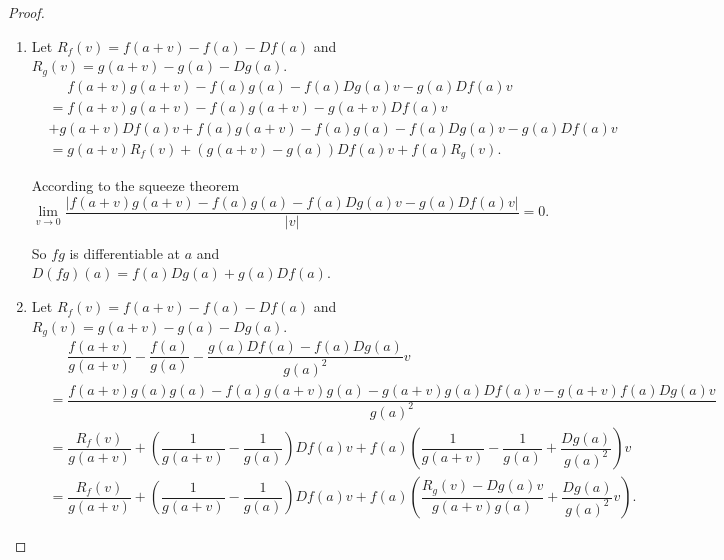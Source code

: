 \begin{proof}
\begin{enumerate}[itemsep=0pt,label={(\alph*)}]
              so \( \lim\limits_{v \to 0} \dfrac{\left\vert (F + G)(a + v) - (F + G)(a) - DF(a)v - DG(a)v \right\vert}{\left\vert v \right\vert} = 0 \). Hence \( F + G \) is differentiable at \( a \) and \( D(F + G)(a) = DF(a) + DG(a) \).
        \item Let \( R_{f}(v) = f(a + v) - f(a) - Df(a) \) and \( R_{g}(v) = g(a + v) - g(a) - Dg(a) \).
              \begingroup
              \allowdisplaybreaks%
              \begin{align*}
                   & \phantom{=} f(a + v)g(a + v) - f(a)g(a) - f(a)Dg(a)v - g(a)Df(a)v    \\
                   & = f(a + v)g(a + v) - f(a)g(a + v) - g(a + v)Df(a)v                   \\
                   & + g(a + v)Df(a)v + f(a)g(a + v) - f(a)g(a) - f(a)Dg(a)v - g(a)Df(a)v \\
                   & = g(a + v) R_{f}(v) + (g(a + v) - g(a))Df(a)v + f(a) R_{g}(v).
              \end{align*}
              \endgroup

              According to the squeeze theorem
              \[
                  \lim\limits_{v \to 0} \dfrac{\left\vert f(a + v)g(a + v) - f(a)g(a) - f(a)Dg(a)v - g(a)Df(a)v \right\vert}{\left\vert v \right\vert} = 0.
              \]

              So \( fg \) is differentiable at \( a \) and \( D(fg)(a) = f(a)Dg(a) + g(a)Df(a) \).
        \item Let \( R_{f}(v) = f(a + v) - f(a) - Df(a) \) and \( R_{g}(v) = g(a + v) - g(a) - Dg(a) \).
              \begingroup
              \allowdisplaybreaks%
              \begin{align*}
                   & \phantom{=} \dfrac{f(a + v)}{g(a + v)} - \dfrac{f(a)}{g(a)} - \dfrac{g(a)Df(a) - f(a)Dg(a)}{{g(a)}^{2}}v                                                                            \\
                   & = \dfrac{f(a + v)g(a)g(a) - f(a)g(a + v)g(a) - g(a + v)g(a)Df(a)v - g(a + v)f(a)Dg(a)v}{{g(a)}^{2}}                                                                                 \\
                   & = \dfrac{R_{f}(v)}{g(a + v)} + \left(\dfrac{1}{g(a + v)} - \dfrac{1}{g(a)}\right) Df(a)v + f(a)\left( \dfrac{1}{g(a + v)} - \dfrac{1}{g(a)} + \dfrac{Dg(a)}{{g(a)}^{2}} \right)v    \\
                   & = \dfrac{R_{f}(v)}{g(a + v)} + \left(\dfrac{1}{g(a + v)} - \dfrac{1}{g(a)}\right) Df(a)v + f(a)\left( \dfrac{R_{g}(v) - Dg(a)v}{g(a + v)g(a)} + \dfrac{Dg(a)}{{g(a)}^{2}}v \right).
              \end{align*}
              \endgroup


\end{enumerate}
\end{proof}
